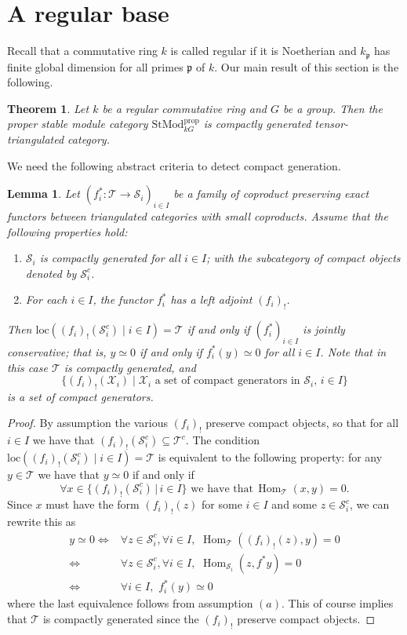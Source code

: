 \documentclass{amsart}
\newcommand{\Hom}{\operatorname{Hom}\nolimits}
\def \T{{\mathcal T}}
\def \S{{\mathcal S}}
\def \pp{\mathfrak{p}}
\numberwithin{equation}{section}%
\newtheorem{theorem}[equation]{Theorem}
\newtheorem{lemma}[equation]{Lemma}
\theoremstyle{remark}
\begin{document}
{\section{A regular base}

Recall that a commutative ring $k$ is called regular if it is Noetherian and $k_\pp$ has finite global dimension for all primes $\pp$ of $k$. Our main result of this section is the following. 

\begin{theorem}\label{thm-proper-compact} 
 Let $k$ be a regular commutative ring and $G$ be a group. Then the proper stable module category $\mathrm{StMod}^{\mathrm{prop}}_{kG}$ is compactly generated tensor-triangulated category. 
\end{theorem}

We need the following abstract criteria to detect compact generation. 

\begin{lemma}\label{lemma-compact-abstract}
   Let $(f^\ast_i\colon \T\to \S_i)_{i\in I}$ be a family of coproduct preserving exact functors between triangulated categories with small coproducts. Assume that the following properties hold:
   \begin{enumerate}
       \item  $\S_i$ is compactly generated for all $i\in I$; with the subcategory of compact objects denoted by $\S_i^c$.
       \item For each $i\in I$, the functor $f^\ast_i$ has a left adjoint $(f_i)_!$.   
   \end{enumerate}
   Then $\mathrm{loc}((f_i)_!(\S_i^c)\mid i\in I)=\T$ if and only if $(f_i^\ast)_{i\in I}$ is jointly conservative; that is, $y\simeq 0$ if and only if $f_i^*(y)\simeq 0$ for all $i\in I$. Note that in this case $\T$ is compactly generated, and
   \[
   \{ (f_i)_!(\mathcal{X}_i)\mid \mathcal{X}_i \mbox{ a set of compact generators in } \S_i, \, i\in I\}
   \]
   is a set of compact generators. 
\end{lemma}

\begin{proof}
By assumption the various $(f_i)_!$ preserve compact objects, so that for all $i\in I$ we have that $(f_i)_!(\mathcal{S}_i^c)\subseteq \T^c$. 
The condition$\mathrm{loc}((f_i)_!(\S_i^c)\mid i\in I)=\T$ is equivalent to the following property: for any $y\in \T$ we have that $y\simeq 0$ if and only if 
\[
\forall x\in \{(f_i)_!(\S_i^c)\,|\, i\in I\}\,\, \mbox{we have that}\, \Hom_\T(x,y)=0.
\] 
Since $x$ must have the form $(f_i)_!(z)$ for some $i\in I $ and some $z\in \S_i^c$, we can rewrite this as 
\begin{align*}
y\simeq 0 \iff &  \forall z\in \S_i^c, \forall i\in I,\,\,  \Hom_\T((f_i)_!(z),y)=0\\ 
 \iff & \forall z\in \S_i^c, \forall i\in I,\,\, \Hom_{\S_i}(z, f^\ast y)=0 \\ 
 \iff & \forall i\in I,\,\, f^\ast_i(y)\simeq 0
\end{align*}    
where the last equivalence follows from assumption $(a)$. This of course implies that $\T$ is compactly generated since the $(f_i)_!$ preserve compact objects.  
\end{proof}


}
\end{document}
